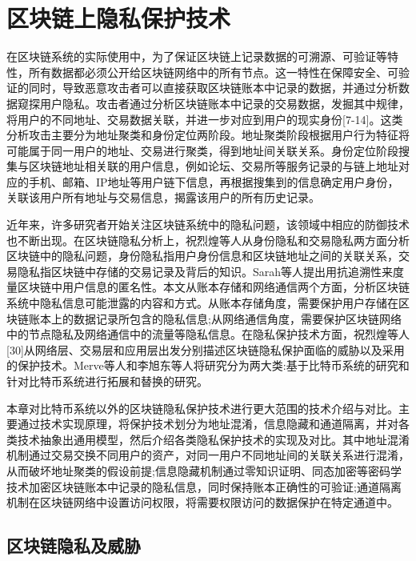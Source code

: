 
\chapter{区块链上隐私保护技术}

在区块链系统的实际使用中，为了保证区块链上记录数据的可溯源、可验证等特性，所有数据都必须公开给区块链网络中的所有节点。这一特性在保障安全、可验证的同时，导致恶意攻击者可以直接获取区块链账本中记录的数据，并通过分析数据窥探用户隐私。攻击者通过分析区块链账本中记录的交易数据，发掘其中规律，将用户的不同地址、交易数据关联，并进一步对应到用户的现实身份[7-14]。这类分析攻击主要分为地址聚类和身份定位两阶段。地址聚类阶段根据用户行为特征将可能属于同一用户的地址、交易进行聚类，得到地址间关联关系。身份定位阶段搜集与区块链地址相关联的用户信息，例如论坛、交易所等服务记录的与链上地址对应的手机、邮箱、IP地址等用户链下信息，再根据搜集到的信息确定用户身份，关联该用户所有地址与交易信息，揭露该用户的所有历史记录。

近年来，许多研究者开始关注区块链系统中的隐私问题，该领域中相应的防御技术也不断出现。在区块链隐私分析上，祝烈煌等人从身份隐私和交易隐私两方面分析区块链中的隐私问题，身份隐私指用户身份信息和区块链地址之间的关联关系，交易隐私指区块链中存储的交易记录及背后的知识。Sarah等人提出用抗追溯性来度量区块链中用户信息的匿名性。本文从账本存储和网络通信两个方面，分析区块链系统中隐私信息可能泄露的内容和方式。从账本存储角度，需要保护用户存储在区块链账本上的数据记录所包含的隐私信息;从网络通信角度，需要保护区块链网络中的节点隐私及网络通信中的流量等隐私信息。在隐私保护技术方面，祝烈煌等人[30]从网络层、交易层和应用层出发分别描述区块链隐私保护面临的威胁以及采用的保护技术。Merve等人和李旭东等人将研究分为两大类:基于比特币系统的研究和针对比特币系统进行拓展和替换的研究。

本章对比特币系统以外的区块链隐私保护技术进行更大范围的技术介绍与对比。主要通过技术实现原理，将保护技术划分为地址混淆，信息隐藏和通道隔离，并对各类技术抽象出通用模型，然后介绍各类隐私保护技术的实现及对比。其中地址混淆机制通过交易交换不同用户的资产，对同一用户不同地址间的关联关系进行混淆，从而破坏地址聚类的假设前提;信息隐藏机制通过零知识证明、同态加密等密码学技术加密区块链账本中记录的隐私信息，同时保持账本正确性的可验证;通道隔离机制在区块链网络中设置访问权限，将需要权限访问的数据保护在特定通道中。

\section{区块链隐私及威胁}

